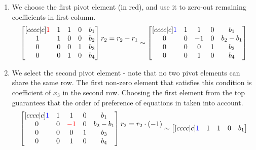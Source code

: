 \begin{enumerate}
\item We choose the first pivot element (in red), and use it to zero-out remaining coefficients in first column.
\begin{equation}
\begin{bmatrix}[cccc|c]
    \textcolor{red}{1} & 1 & 1 & 0 & b_1 \\ 
    1 & 1 & 0 & 0 & b_2 \\ 
    0 & 0 & 0 & 1 & b_3 \\ 
    0 & 0 & 1 & 0 & b_4
\end{bmatrix}
\begin{matrix} \\ r_2 = r_2 - r_1 \\ \\ \\ \end{matrix} \sim
\begin{bmatrix}[cccc|c]
    \textcolor{blue}{1} & 1 & 1 & 0 & b_1 \\ 
    0 & 0 & -1 & 0 & b_2 - b_1 \\ 
    0 & 0 & 0 & 1 & b_3 \\ 
    0 & 0 & 1 & 0 & b_4
\end{bmatrix}
\end{equation}
\item We select the second pivot element - note that no two pivot elements can share the same row.
The first non-zero element that satisfies this condition is coefficient of $x_3$ in the second row.
Choosing the first element from the top guarantees that the order of preference of equations in taken into account.
\begin{equation}
\begin{bmatrix}[cccc|c]
    \textcolor{blue}{1} & 1 & 1 & 0 & b_1 \\ 
    0 & 0 & \textcolor{red}{-1} & 0 & b_2 - b_1 \\ 
    0 & 0 & 0 & 1 & b_3 \\ 
    0 & 0 & 1 & 0 & b_4
\end{bmatrix}
\begin{matrix} \\ r_2 = r_2 \cdot (-1) \\ \\ \\ \end{matrix} \sim
\begin{bmatrix}[cccc|c]
    \textcolor{blue}{1} & 1 & 1 & 0 & b_1 \\ 

\end{bmatrix}
\end{equation}
\end{enumerate}
